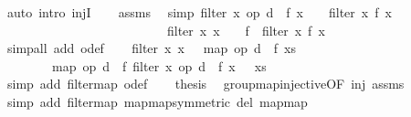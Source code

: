 \begin{isabellebody}
\ {\isacharparenleft}auto\ intro{\isacharcolon}\ injI{\isacharparenright}\isanewline
\ \ \isamarkupfalse%
\ assms\ \isamarkupfalse%
\ {\isacharbrackleft}simp{\isacharbrackright}{\isacharcolon}\ {\isachardoublequoteopen}filter\ {\isacharparenleft}{\isasymlambda}x{\isachardot}\ {\isacharparenleft}op{\isacharasterisk}\ d\ {\isasymcirc}\ f{\isacharparenright}\ x\ {\isasymnoteq}\ {}{\isacharparenright}\ {\isacharequal}\ filter\ {\isacharparenleft}{\isasymlambda}x{\isachardot}\ f\ x\ {\isasymnoteq}\ {}{\isacharparenright}{\isachardoublequoteclose}\isanewline
\ \ \ \ \ \ \ \ \ \ \ \ \ \ \ \ \ \ \ \ \ \ \ \ \ \ {\isachardoublequoteopen}filter\ {\isacharparenleft}{\isacharparenleft}{\isasymlambda}x{\isachardot}\ x\ {\isasymnoteq}\ {}{\isacharparenright}\ {\isasymcirc}\ f{\isacharparenright}\ {\isacharequal}\ filter\ {\isacharparenleft}{\isasymlambda}x{\isachardot}\ f\ x\ {\isasymnoteq}\ {}{\isacharparenright}{\isachardoublequoteclose}\isanewline
\ \ \ \ \ \ \isamarkupfalse%
\ {\isacharparenleft}simp{\isacharunderscore}all\ add{\isacharcolon}\ o{\isacharunderscore}def{\isacharparenright}\isanewline
\ \ \isamarkupfalse%
\ {\isachardoublequoteopen}filter\ {\isacharparenleft}{\isasymlambda}x{\isachardot}\ x\ {\isasymnoteq}\ {}{\isacharparenright}\ {\isacharparenleft}map\ {\isacharparenleft}op{\isacharasterisk}\ d\ {\isasymcirc}\ f{\isacharparenright}\ xs{\isacharparenright}\ {\isacharequal}\ \isanewline
\ \ \ \ \ \ \ \ map\ {\isacharparenleft}op{\isacharasterisk}\ d\ {\isasymcirc}\ f{\isacharparenright}\ {\isacharparenleft}filter\ {\isacharparenleft}{\isasymlambda}x{\isachardot}\ {\isacharparenleft}op{\isacharasterisk}\ d\ {\isasymcirc}\ f{\isacharparenright}\ x\ {\isasymnoteq}\ {}{\isacharparenright}\ xs{\isacharparenright}{\isachardoublequoteclose}\ \isanewline
\ \ \ \ \ \ \isamarkupfalse%
\ {\isacharparenleft}simp\ add{\isacharcolon}\ filter{\isacharunderscore}map\ o{\isacharunderscore}def{\isacharparenright}\isanewline
\ \ \isamarkupfalse%
\ {\isacharquery}thesis\ \isamarkupfalse%
\ group{\isacharunderscore}map{\isacharunderscore}injective{\isacharbrackleft}OF\ inj{\isacharbrackright}\ assms\isanewline
\ \ \ \ \ \ \isamarkupfalse%
\ {\isacharparenleft}simp\ add{\isacharcolon}\ filter{\isacharunderscore}map\ map{\isacharunderscore}map{\isacharbrackleft}symmetric{\isacharbrackright}\ del{\isacharcolon}\ map{\isacharunderscore}map{\isacharparenright}\isanewline
{}\isamarkupfalse%

\end{isabellebody}
